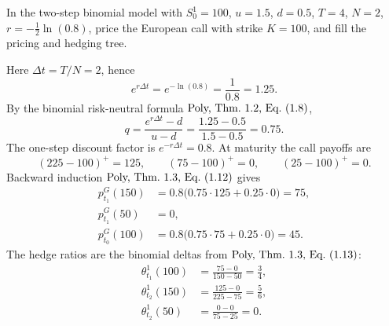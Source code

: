\begin{exercise}
In the two-step binomial model with \(S^1_0=100\), \(u=1.5\), \(d=0.5\),
\(T=4\), \(N=2\), \(r=-\frac12\ln(0.8)\), price the European call with
strike \(K=100\), and fill the pricing and hedging tree.
\end{exercise}

\begin{solution}
Here \(\Delta t=T/N=2\), hence
\[
  e^{r\Delta t}
  =
  e^{-\ln(0.8)}
  =
  \frac{1}{0.8}
  =
  1.25.
\]
By the binomial risk-neutral formula \(\textup{Poly, Thm.~1.2, Eq.~(1.8)}\),
\[
  q=\frac{e^{r\Delta t}-d}{u-d}
   =\frac{1.25-0.5}{1.5-0.5}
   =0.75.
\]
The one-step discount factor is \(e^{-r\Delta t}=0.8\).  At maturity the call
payoffs are
\[
  (225-100)^+=125,\qquad (75-100)^+=0,\qquad (25-100)^+=0.
\]
Backward induction \(\textup{Poly, Thm.~1.3, Eq.~(1.12)}\) gives
\[
\begin{aligned}
  p^G_{t_1}(150)
    &=0.8\bigl(0.75\cdot125+0.25\cdot0\bigr)=75,\\
  p^G_{t_1}(50)
    &=0,\\
  p^G_{t_0}(100)
    &=0.8\bigl(0.75\cdot75+0.25\cdot0\bigr)=45.
\end{aligned}
\]
The hedge ratios are the binomial deltas from
\(\textup{Poly, Thm.~1.3, Eq.~(1.13)}\):
\[
\begin{aligned}
  \theta^1_{t_1}(100)
    &=\frac{75-0}{150-50}=\frac34,\\
  \theta^1_{t_2}(150)
    &=\frac{125-0}{225-75}=\frac56,\\
  \theta^1_{t_2}(50)
    &=\frac{0-0}{75-25}=0.
\end{aligned}
\]


\end{solution}

